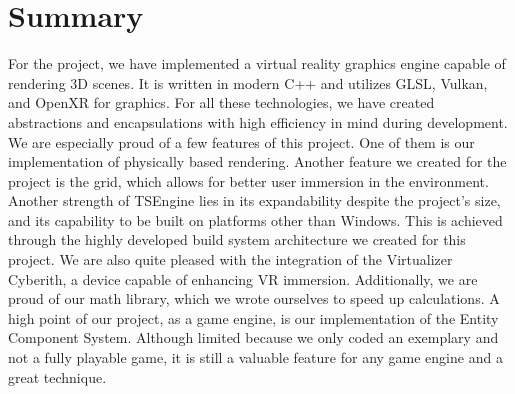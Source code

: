\newpage
\section{Summary}
\label{sec:summary}
\hspace{\parindent}
For the project, we have implemented a virtual reality graphics engine capable of rendering 3D scenes. It is written in modern C++ and utilizes GLSL, Vulkan, and OpenXR for graphics. For all these technologies, we have created abstractions and encapsulations with high efficiency in mind during development. We are especially proud of a few features of this project. One of them is our implementation of physically based rendering. Another feature we created for the project is the grid, which allows for better user immersion in the environment. Another strength of TSEngine lies in its expandability despite the project's size, and its capability to be built on platforms other than Windows. This is achieved through the highly developed build system architecture we created for this project. We are also quite pleased with the integration of the Virtualizer Cyberith, a device capable of enhancing VR immersion. Additionally, we are proud of our math library, which we wrote ourselves to speed up calculations. A high point of our project, as a game engine, is our implementation of the Entity Component System. Although limited because we only coded an exemplary and not a fully playable game, it is still a valuable feature for any game engine and a great technique.